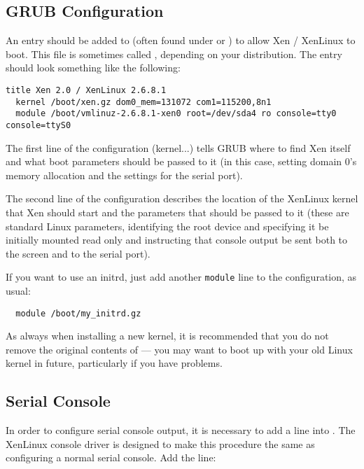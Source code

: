 \documentclass[11pt,twoside,final,openright]{xenstyle}
\begin{document}
\subsection{GRUB Configuration}

An entry should be added to  (often found under
 or ) to allow Xen / XenLinux to boot.
This file is sometimes called , depending on your
distribution.  The entry should look something like the following:

\begin{verbatim}
title Xen 2.0 / XenLinux 2.6.8.1
  kernel /boot/xen.gz dom0_mem=131072 com1=115200,8n1
  module /boot/vmlinuz-2.6.8.1-xen0 root=/dev/sda4 ro console=tty0 console=ttyS0
\end{verbatim}

The first line of the configuration (kernel...) tells GRUB where to
find Xen itself and what boot parameters should be passed to it (in
this case, setting domain 0's memory allocation and the settings for
the serial port).

The second line of the configuration describes the location of the
XenLinux kernel that Xen should start and the parameters that should
be passed to it (these are standard Linux parameters, identifying the
root device and specifying it be initially mounted read only and
instructing that console output be sent both to the screen and to the
serial port).

If you want to use an initrd, just add another {\tt module} line to
the configuration, as usual:
\begin{verbatim}
  module /boot/my_initrd.gz
\end{verbatim}

As always when installing a new kernel, it is recommended that you do
not remove the original contents of  --- you may want
to boot up with your old Linux kernel in future, particularly if you
have problems.


\subsection{Serial Console}

In order to configure serial console output, it is necessary to add a
line into .  The XenLinux console driver is
designed to make this procedure the same as configuring a normal
serial console.  Add the line:
\end{document}
